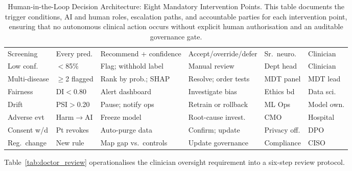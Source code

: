 \begin{table}[!htbp]
\tablestripes\tablefontsize
\caption[Human-in-the-Loop Decision Architecture: Eight Mandatory]{Human-in-the-Loop Decision Architecture: Eight Mandatory Intervention Points. This table documents the trigger conditions, AI and human roles, escalation paths, and accountable parties for each intervention point, ensuring that no autonomous clinical action occurs without explicit human authorisation and an auditable governance gate.}
\tablefontsize
\begin{tabularx}{\textwidth}{@{} >{\raggedright\arraybackslash}p{1.2cm} >{\raggedright\arraybackslash}p{1.0cm} L L L >{\raggedright\arraybackslash}p{1.0cm} @{}}
\toprule
{} &  &  &  &  &  \\
\midrule
Screening & Every pred. & Recommend + confidence & Accept/override/defer & Sr.\ neuro. & Clinician \\
\addlinespace
Low conf. & $<$85\% & Flag; withhold label & Manual review & Dept head & Clinician \\
\addlinespace
Multi-disease & $\geq$2 flagged & Rank by prob.; SHAP & Resolve; order tests & MDT panel & MDT lead \\
\addlinespace
Fairness & DI$<$0.80 & Alert dashboard & Investigate bias & Ethics bd & Data sci. \\
\addlinespace
Drift & PSI$>$0.20 & Pause; notify ops & Retrain or rollback & ML Ops & Model own. \\
\addlinespace
Adverse evt & Harm$\to$AI & Freeze model & Root-cause invest. & CMO & Hospital \\
\addlinespace
Consent w/d & Pt revokes & Auto-purge data & Confirm; update & Privacy off. & DPO \\
\addlinespace
Reg.\ change & New rule & Map gap vs.\ controls & Update governance & Compliance & CISO \\
\bottomrule
\end{tabularx}
\end{table}

Table~\ref{tab:doctor_review} operationalises the clinician oversight requirement into a six-step review protocol.


